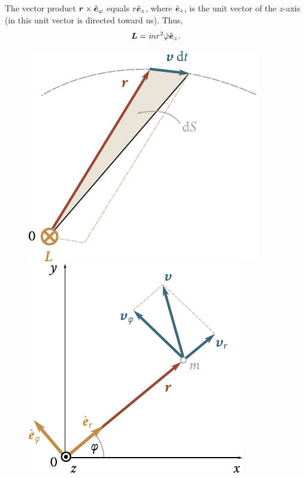\noindent
The vector product $\boldsymbol{r}\times\hat{\boldsymbol{e}}_{\varphi}$ equals $r\hat{\boldsymbol{e}}_{z}$, where $\hat{\boldsymbol{e}}_{z}$, is the unit vector of the $z$-axis (in  this unit vector is directed toward us). Thus,
\begin{equation}\label{eq:3_123}
\boldsymbol{L} = mr^2\dot{\varphi}\hat{\boldsymbol{e}}_{z}.
\end{equation}

\begin{figure}[t]
	\begin{minipage}[t]{0.5\linewidth}
		\begin{center}
			\includegraphics[scale=0.95]{figures/ch_03/fig_3_26.pdf}
			\caption[]{}
			\label{fig:3_26}
		\end{center}
	\end{minipage}
	\hspace{-0.05cm}
	\begin{minipage}[t]{0.5\linewidth}
		\begin{center}
			\includegraphics[scale=0.95]{figures/ch_03/fig_3_27.pdf}
			\caption[]{}
			\label{fig:3_27}
		\end{center}
	\end{minipage}
	\vspace{-0.3cm}
\end{figure}

